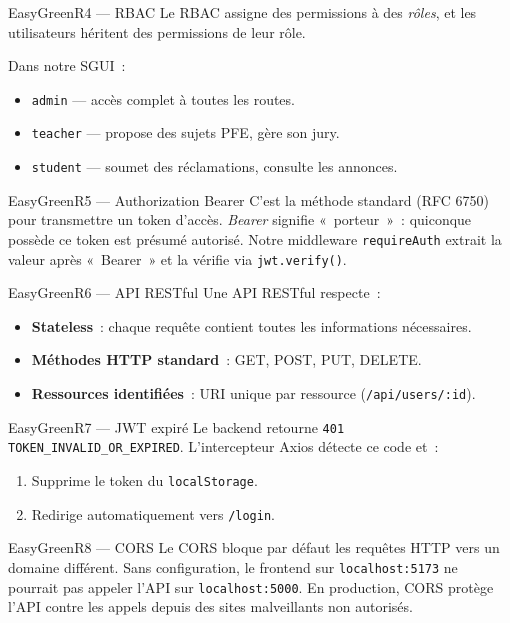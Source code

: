 \documentclass[12pt,a4paper,oneside]{report}
\begin{document}
\begin{qbox}{EasyGreen}{R4 --- RBAC}
Le RBAC assigne des permissions à des \textit{rôles}, et les utilisateurs
héritent des permissions de leur rôle.

Dans notre SGUI~:
\begin{itemize}
  \item \texttt{admin}   --- accès complet à toutes les routes.
  \item \texttt{teacher} --- propose des sujets PFE, gère son jury.
  \item \texttt{student} --- soumet des réclamations, consulte les
        annonces.
\end{itemize}
\end{qbox}

\begin{qbox}{EasyGreen}{R5 --- Authorization Bearer}
C'est la méthode standard (RFC 6750) pour transmettre un token d'accès.
\textit{Bearer} signifie «~porteur~»~: quiconque possède ce token est
présumé autorisé. Notre middleware \texttt{requireAuth} extrait la valeur
après «~Bearer~» et la vérifie via \texttt{jwt.verify()}.
\end{qbox}

\begin{qbox}{EasyGreen}{R6 --- API RESTful}
Une API RESTful respecte~:
\begin{itemize}
  \item \textbf{Stateless}~: chaque requête contient toutes les
        informations nécessaires.
  \item \textbf{Méthodes HTTP standard}~: GET, POST, PUT, DELETE.
  \item \textbf{Ressources identifiées}~: URI unique par ressource
        (\texttt{/api/users/:id}).
\end{itemize}
\end{qbox}

\begin{qbox}{EasyGreen}{R7 --- JWT expiré}
Le backend retourne \texttt{401 TOKEN\_INVALID\_OR\_EXPIRED}.
L'intercepteur Axios détecte ce code et~:
\begin{enumerate}
  \item Supprime le token du \texttt{localStorage}.
  \item Redirige automatiquement vers \texttt{/login}.
\end{enumerate}
\end{qbox}

\begin{qbox}{EasyGreen}{R8 --- CORS}
Le CORS bloque par défaut les requêtes HTTP vers un domaine différent.
Sans configuration, le frontend sur \texttt{localhost:5173} ne pourrait
pas appeler l'API sur \texttt{localhost:5000}. En production, CORS
protège l'API contre les appels depuis des sites malveillants non
autorisés.
\end{qbox}
\end{document}
